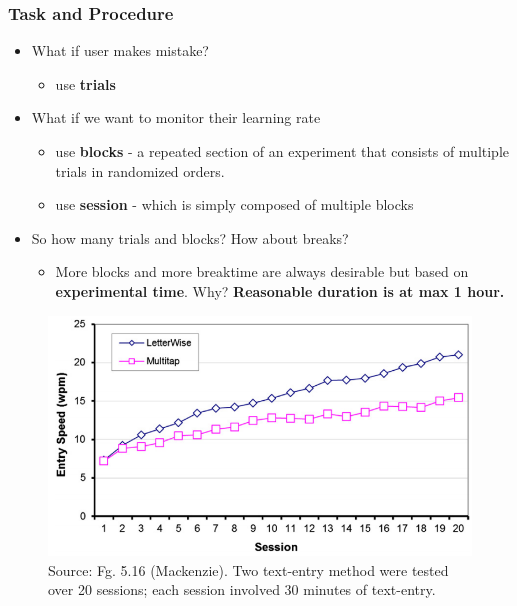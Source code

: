\documentclass{beamer}
\begin{document}
\begin{frame}
\frametitle{Task and Procedure}
\begin{itemize}
		\item What if user makes mistake?
		\begin{itemize}
			\item use \textbf{trials}
		\end{itemize}
		\item What if we want to monitor their learning rate 
		\begin{itemize}
			\item use \textbf{blocks} - a repeated section of an experiment that consists of multiple trials in randomized orders.
			 \item use \textbf{session} - which is simply composed of multiple blocks
		\end{itemize}				
	\item So how many trials and blocks?  How about breaks?
	\begin{itemize}
		\item More blocks and more breaktime are always desirable but based on \textbf{experimental time}.   Why? \textbf{Reasonable duration is at max 1 hour.}
	\end{itemize}
\end{itemize}
\begin{figure}
		\includegraphics[width=0.3\linewidth]{long}
		
		\caption{Source: Fg. 5.16 (Mackenzie).  Two text-entry method were tested over 20 sessions; each session involved 30 minutes of text-entry.}
	\end{figure}
\end{frame}
\end{document}
